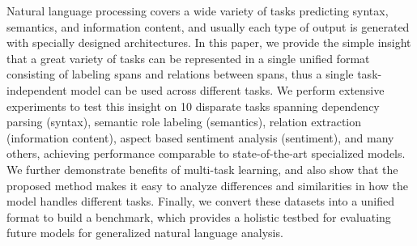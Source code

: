 Natural language processing covers a wide variety of tasks predicting syntax, semantics, and information content, and usually each type of output is generated with specially designed architectures. In this paper, we provide the simple insight that a great variety of tasks can be represented in a single unified format consisting of labeling spans and relations between spans, thus a single task-independent model can be used across different tasks. We perform extensive experiments to test this insight on 10 disparate tasks spanning dependency parsing (syntax), semantic role labeling (semantics), relation extraction (information content), aspect based sentiment analysis (sentiment), and many others, achieving performance comparable to state-of-the-art specialized models. We further demonstrate benefits of multi-task learning, and also show that the proposed method makes it easy to analyze differences and similarities in how the model handles different tasks. Finally, we convert these datasets into a unified format to build a benchmark, which provides a holistic testbed for evaluating future models for generalized natural language analysis.
